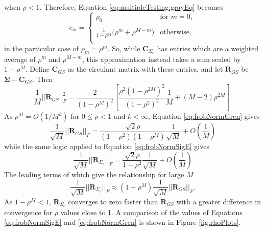 \documentclass[letterpaper,12pt,oneside,final]{article}
\newcommand{\m}[1]{\mathbf{#1}}               %
\newcommand{\sm}[1]{\boldsymbol{#1}}   %
\newcommand{\norm}[1]{||{#1}||}              %
\newcommand{\frob}[1]{\norm{#1}_F}
\begin{document}
when $\rho < 1$. Therefore, Equation \ref{eq:multipleTesting:grayEq} becomes
\begin{equation} \label{eq:multipleTesting:grayApprox}
  c_m = \begin{cases}
    \rho_0 & \text{for } m = 0, \\
    & \\
    \frac{1}{1 - \rho^M} \big ( \rho^m + \rho^{M-m} \big )  & \text{otherwise},\\
  \end{cases}
\end{equation}
in the particular case of $\rho_m = \rho^m$. So, while $\m{C}_{\Sigma_e}$ has entries which are a weighted average of $\rho^m$ and $\rho^{M-m}$, this approximation instead takes a sum scaled by $1 - \rho^M$. Define $\m{C}_{GS}$ as the circulant matrix with these entries, and let $\m{R}_{GS}$ be $\sm{\Sigma} - \m{C}_{GS}$. Then
\begin{equation} \label{eq:frobNormGren}
    \frac{1}{M} \frob{\m{R}_{GS}}^2 = \frac{2}{(1 - \rho^M)^2} \left [ \frac{\rho^2 (1 - \rho^{2M})^2}{(1 - \rho^2)^2} \frac{1}{M} + (M - 2) \rho^{2M} \right ].
\end{equation}
As $\rho^M = O(1/M^k)$ for $0 \leq \rho < 1$ and $k < \infty$, Equation \ref{eq:frobNormGren} gives
\begin{equation} \label{eq:GrenLeading}
  \frac{1}{\sqrt{M}} \frob{\m{R}_{GS}} = \frac{\sqrt{2} \rho}{(1 - \rho^2) (1 - \rho^M)} \frac{1}{\sqrt{M}} + O\left(\frac{1}{M}\right)
\end{equation}
while the same logic applied to Equation \ref{eq:frobNormSigE} gives
\begin{equation} \label{eq:nearLeading}
  \frac{1}{\sqrt{M}} \frob{\m{R}_{\Sigma_e}} = \frac{\sqrt{2} \rho}{1 - \rho^2} \frac{1}{\sqrt{M}} + O\left(\frac{1}{M}\right)
\end{equation}
The leading terms of which give the relationship for large $M$
\begin{equation*}
 \frac{1}{\sqrt{M}}\frob{\m{R}_{\Sigma_e}} \approx (1 - \rho^M) \frac{1}{\sqrt{M}} \frob{\m{R}_{GS}}.
\end{equation*}
As $1 - \rho^M < 1$, $\m{R}_{\Sigma_e}$ converges to zero faster than $\m{R}_{GS}$ with a greater difference in convergence for $\rho$ values close to 1. A comparison of the values of Equations \ref{eq:frobNormSigE} and \ref{eq:frobNormGren} is shown in Figure \ref{fig:rhoPlots}.
\end{document}
